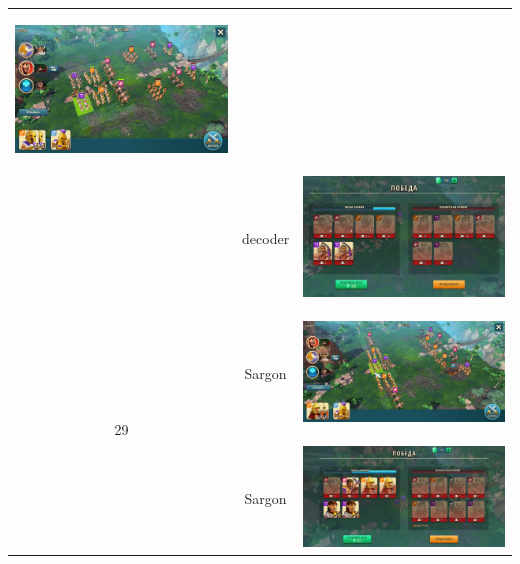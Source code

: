 \begin{longtable}{|c|c|c|}
	\hypertarget{fight28}{\includegraphics[width=0.75\linewidth]{./parts/media/TreasureHunt/28/decoder/photo_2022-04-13_19-02-12.jpg}} \\
	& decoder &
	\includegraphics[width=0.75\linewidth]{./parts/media/TreasureHunt/28/decoder/photo_2022-04-13_19-02-29.jpg} \\
	\hline
	\multirow{8}{*}{29} & Sargon &
	\hypertarget{fight29}{\includegraphics[width=0.75\linewidth]{./parts/media/TreasureHunt/29/sargon/photo_2022-04-07_10-02-57.jpg}} \\
	& Sargon &
	\includegraphics[width=0.75\linewidth]{./parts/media/TreasureHunt/29/sargon/photo_2022-04-07_10-03-11.jpg} \\

\end{longtable}

